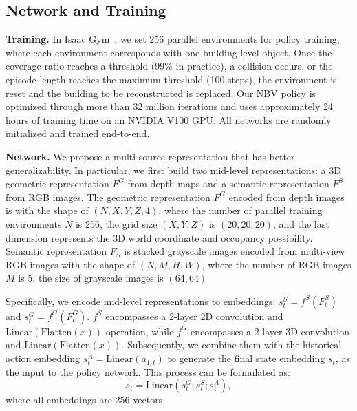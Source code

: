 \vspace{5pt}
\subsection{Network and Training}
    \noindent \textbf{Training.}\quad
    In Isaac Gym~\citep{makoviychuk2021isaac}, we set 256 parallel environments for policy training, where each environment corresponds with one building-level object. %
    Once the coverage ratio reaches a threshold (99\% in practice), a collision occurs, or the episode length reaches the maximum threshold (100 steps), the environment is reset and the building to be reconstructed is replaced.
    Our NBV policy is optimized through more than 32 million iterations and uses approximately 24 hours of training time on an NVIDIA V100 GPU. All networks are randomly initialized and trained end-to-end.

    \noindent \textbf{Network.}\quad
    We propose a multi-source representation that has better generalizability. In particular, we first build two mid-level representations: a 3D geometric representation $F^G$ from depth maps and a semantic representation $F^S$ from RGB images. The geometric representation $F^G$ encoded from depth images is with the shape of $(N, X, Y, Z, 4)$, where the number of parallel training environments $N$ is 256, the grid size $(X, Y, Z)$ is $(20, 20, 20)$, and the last dimension represents the 3D world coordinate and occupancy possibility. Semantic representation $F_S$ is stacked grayscale images encoded from multi-view RGB images with the shape of $(N, M, H, W)$, where the number of RGB images $M$ is 5, the size of grayscale images is $(64, 64)$

    Specifically, we encode mid-level representations to embeddings: $s^S_t=f^S(F^S_t)$ and $s^G_t=f^G(F^G_t)$. $f^S$ encompasses a 2-layer 2D convolution and $\mathrm{Linear}(\mathrm{Flatten}(x))$ operation, while $f^G$ encompasses a 2-layer 3D convolution and $\mathrm{Linear}(\mathrm{Flatten}(x))$. Subsequently, we combine them with the historical action embedding $s^A_t=\mathrm{Linear}(a_{1:t})$ to generate the final state embedding $s_t$, as the input to the policy network. This process can be formulated as: %
        \begin{equation}
        \label{eqn:state}
        s_t = \mathrm{Linear}(s^G_t; s^S_t; s^A_t),
        \end{equation}
    where all embeddings are 256 vectors.

